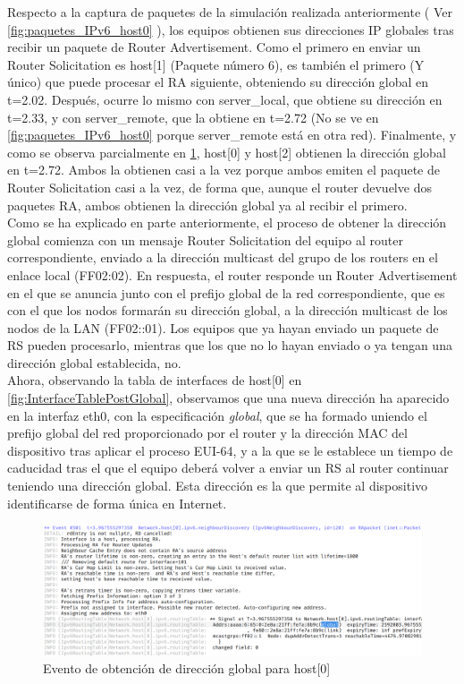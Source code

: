 Respecto a la captura de paquetes de la simulación realizada anteriormente ( Ver \ref{fig:paquetes_IPv6_host0} ), los equipos obtienen sus direcciones IP globales tras recibir un paquete de Router Advertisement. Como el primero en enviar un Router Solicitation es host[1] (Paquete número 6), es también el primero (Y único) que puede procesar el RA siguiente, obteniendo su dirección global en t=2.02. Después, ocurre lo mismo con server\_local, que obtiene su dirección en t=2.33, y con server\_remote, que la obtiene en t=2.72 (No se ve en \ref{fig:paquetes_IPv6_host0} porque server\_remote está en otra red). Finalmente, y como se observa parcialmente en \ref{fig:global_host0}, host[0] y host[2] obtienen la dirección global en t=2.72. Ambos la obtienen casi a la vez porque ambos emiten el paquete de Router Solicitation casi a la vez, de forma que, aunque el router devuelve dos paquetes RA, ambos obtienen la dirección global ya al recibir el primero. \\
Como se ha explicado en parte anteriormente, el proceso de obtener la dirección global comienza con un mensaje Router Solicitation del equipo al router correspondiente, enviado a la dirección multicast del grupo de los routers en el enlace local (FF02:02). En respuesta, el router responde un Router Advertisement en el que se anuncia junto con el prefijo global de la red correspondiente, que es con el que los nodos formarán su dirección global, a la dirección multicast de los nodos de la LAN (FF02::01). Los equipos que ya hayan enviado un paquete de RS pueden procesarlo, mientras que los que no lo hayan enviado o ya tengan una dirección global establecida, no. \\
Ahora, observando la tabla de interfaces de host[0] en \ref{fig:InterfaceTablePostGlobal}, observamos que una nueva dirección ha aparecido en la interfaz eth0, con la especificación \textit{global}, que se ha formado uniendo el prefijo global del red proporcionado por el router y la dirección MAC del dispositivo tras aplicar el proceso EUI-64, y a la que se le establece un tiempo de caducidad tras el que el equipo deberá volver a enviar un RS al router continuar teniendo una dirección global. Esta dirección es la que permite al dispositivo identificarse de forma única en Internet.

\begin{figure}[H]
    \centering
    \includegraphics[width=135mm, scale=0.75]{imaxes/ejercicio2_5_1.png}
    \caption{Evento de obtención de dirección global para host[0]}
    \label{fig:global_host0}
\end{figure}

